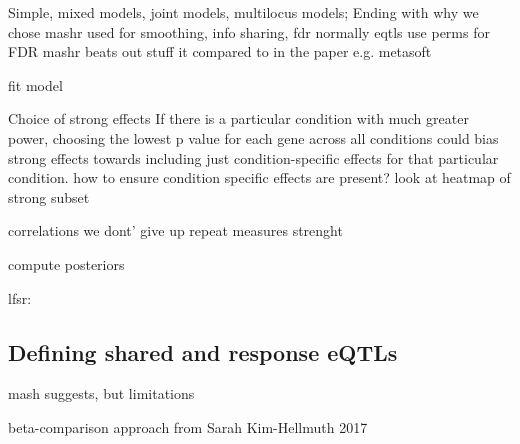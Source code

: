 
Simple, mixed models, joint models, multilocus models; Ending with why we chose mashr
used for smoothing, info sharing, fdr
    normally eqtls use perms for FDR
mashr beats out stuff it compared to in the paper e.g. metasoft

fit model

Choice of strong effects
If there is a particular condition with much greater power, choosing the lowest p value for each gene across all conditions could bias strong effects towards including just condition-specific effects for that particular condition.
how to ensure condition specific effects are present? look at heatmap of strong subset

correlations
    we dont' give up repeat measures strenght

compute posteriors

lfsr:

\subsection{Defining shared and response eQTLs}

mash suggests, but limitations

beta-comparison approach from Sarah Kim-Hellmuth 2017

